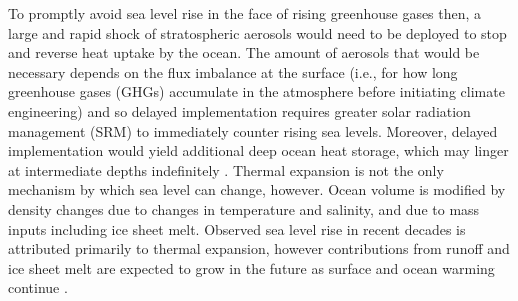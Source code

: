 \documentclass[draft,grl]{AGUTeX}  %
\begin{document}
\begin{article}

To promptly avoid sea level rise in the face of rising greenhouse gases then, a large and rapid shock of stratospheric aerosols would need to be deployed to stop and reverse heat uptake by the ocean. The amount of aerosols that would be necessary depends on the flux imbalance at the surface (i.e., for how long greenhouse gases (GHGs) accumulate in the atmosphere before initiating climate engineering) and so delayed implementation requires greater solar radiation management (SRM) to immediately counter rising sea levels. Moreover, delayed implementation would yield additional deep ocean heat storage, which may linger at intermediate depths indefinitely \citep{gillett11}. Thermal expansion is not the only mechanism by which sea level can change, however. Ocean volume is modified by density changes due to changes in temperature and salinity, and due to mass inputs including ice sheet melt. Observed sea level rise in recent decades is attributed primarily to thermal expansion, however contributions from runoff and ice sheet melt are expected to grow in the future as surface and ocean warming continue \citep{bindoff07}. 

 

\end{article}
\end{document}
